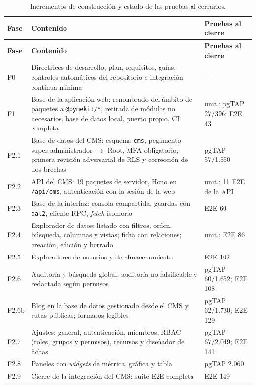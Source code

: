 \begin{longtable}{@{}l>{\raggedright\arraybackslash}p{9.6cm}>{\raggedright\arraybackslash}p{3.0cm}@{}}
  \caption{Incrementos de construcción y estado de las pruebas al cerrarlos.}\label{tab:imp-fases}\\
  \toprule
  \textbf{Fase} & \textbf{Contenido} & \textbf{Pruebas al cierre} \\
  \midrule
  \endfirsthead
  \toprule
  \textbf{Fase} & \textbf{Contenido} & \textbf{Pruebas al cierre} \\
  \midrule
  \endhead
  \bottomrule
  \endfoot
  F0 & Directrices de desarrollo, plan, requisitos, guías, controles automáticos del repositorio e integración continua mínima & --- \\
  F1 & Base de la aplicación web: renombrado del ámbito de paquetes a \texttt{@pymekit/*}, retirada de módulos no necesarios, base de datos local, puerto propio, CI completa & 61 unit.; pgTAP 27/396; E2E 43 \\
  F2.1 & Base de datos del CMS: esquema \texttt{cms}, pegamento super-administrador $\rightarrow$ Root, MFA obligatorio; primera revisión adversarial de RLS y corrección de dos brechas & pgTAP 57/1.550 \\
  F2.2 & API del CMS: 19 paquetes de servidor, Hono en \texttt{/api/cms}, autenticación con la sesión de la web & 1.130 unit.; 11 E2E de la API \\
  F2.3 & Base de la interfaz: consola compartida, guardas con \texttt{aal2}, cliente RPC, \textit{fetch} isomorfo & E2E 60 \\
  F2.4 & Explorador de datos: listado con filtros, orden, búsqueda, columnas y vistas; ficha con relaciones; creación, edición y borrado & 1.313 unit.; E2E 86 \\
  F2.5 & Exploradores de usuarios y de almacenamiento & E2E 102 \\
  F2.6 & Auditoría y búsqueda global; auditoría no falsificable y redactada según permisos & pgTAP 60/1.652; E2E 108 \\
  F2.6b & Blog en la base de datos gestionado desde el CMS y rutas públicas; formatos legibles & pgTAP 62/1.730; E2E 129 \\
  F2.7 & Ajustes: general, autenticación, miembros, RBAC (roles, grupos y permisos), recursos y diseñador de fichas & pgTAP 67/2.049; E2E 141 \\
  F2.8 & Paneles con \textit{widgets} de métrica, gráfica y tabla & pgTAP 2.060 \\
  F2.9 & Cierre de la integración del CMS: suite E2E completa & E2E 149 \\

\end{longtable}
